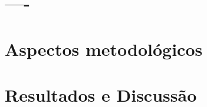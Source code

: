 \documentclass[twoside]{article}
\begin{document}
\begin{multicols}{2}
    \section{----}

  \fi

  \section{Aspectos metodológicos}



  \section{Resultados e Discussão}




  \iffalse


\end{multicols}
\end{document}
